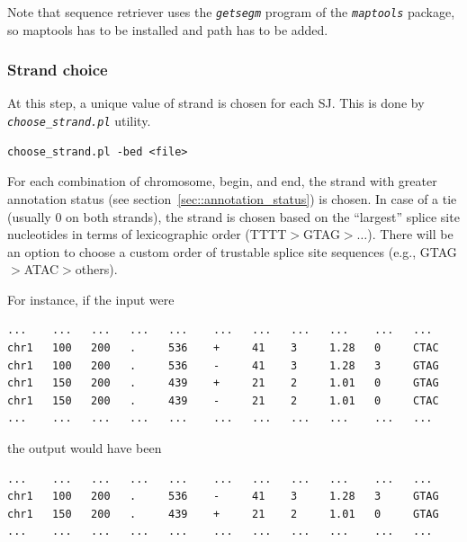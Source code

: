 \documentclass{article}
\newcommand{\prog}[1]{{\tt\em #1}}
\begin{document}
Note that sequence retriever uses the \prog{getsegm} program of the \prog{maptools} package, so maptools has to be installed and path has to be added.


\subsubsection{Strand choice}
At this step, a unique value of strand is chosen for each SJ. This is done by \prog{choose\_strand.pl} utility. 
\begin{verbatim}
choose_strand.pl -bed <file>
\end{verbatim}
For each combination of chromosome, begin, and end, the strand with greater annotation status (see section~\ref{sec::annotation_status}) is chosen. In case of 
a tie (usually $0$ on both strands), the strand is chosen based on the ``largest'' splice site nucleotides in terms of lexicographic order (TTTT$>$GTAG$>\dots$).
There will be an option to choose a custom order of trustable splice site sequences (e.g., GTAG$>$ATAC$>$others).

For instance, if the input were
\begin{verbatim}
...    ...   ...   ...   ...    ...   ...   ...   ...    ...   ...
chr1   100   200   .     536    +     41    3     1.28   0     CTAC
chr1   100   200   .     536    -     41    3     1.28   3     GTAG
chr1   150   200   .     439    +     21    2     1.01   0     GTAG
chr1   150   200   .     439    -     21    2     1.01   0     CTAC
...    ...   ...   ...   ...    ...   ...   ...   ...    ...   ...
\end{verbatim}
the output would have been 
\begin{verbatim}
...    ...   ...   ...   ...    ...   ...   ...   ...    ...   ...
chr1   100   200   .     536    -     41    3     1.28   3     GTAG
chr1   150   200   .     439    +     21    2     1.01   0     GTAG
...    ...   ...   ...   ...    ...   ...   ...   ...    ...   ...
\end{verbatim}

\end{document}
